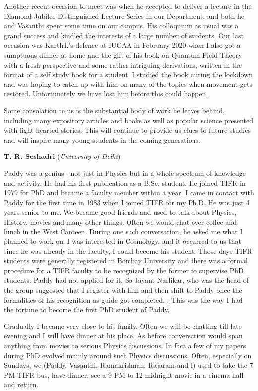 \documentclass[prd, preprint, longbibliography, 11pt]{revtex4-1}
\begin{document}
Another recent occasion to meet was when he accepted to deliver a lecture in the Diamond Jubilee Distinguished Lecture Series in our Department, and both he and Vasanthi spent some time on our campus.  His colloquium as usual was a grand success and kindled the interests of a large number of students. Our last occasion was Karthik’s defence at IUCAA in February 2020 when I also got a sumptuous dinner at home and the gift of his book on Quantum Field Theory with a fresh perspective and some rather intriguing derivations, written in the format of a self study book for a student. I studied the book during the lockdown and was hoping to catch up with him on many of the topics when movement gets restored. Unfortunately we have lost him before this could happen. 


Some consolation to us is the substantial body of work he leaves behind, including many expository articles and books as well as popular science  presented with light hearted stories. This will continue to provide us clues to future studies and will inspire many young students in the coming generations. 

\bigskip
\bigskip

\centerline{{\bf T. R. Seshadri} ({\it University of Delhi})}
\medskip
{}

\noindent Paddy was a genius - not just in Physics but in a whole spectrum of knowledge and activity. He had his first publication as a B.Sc. student. He joined TIFR in 1979 for PhD and became a faculty member within a year. I came in contact with Paddy for the first time in 1983 when I joined TIFR for my Ph.D. He was just 4 years senior to me. We became good friends and used to talk about Physics, History, movies and many other things. Often we would chat over coffee and lunch in the West Canteen. During one such conversation, he asked me what I planned to work on. I was interested in Cosmology, and it occurred to us that since he was already in the faculty, I could become his student. Those days TIFR students were generally registered in Bombay University and there was a formal procedure for a TIFR faculty to be recognized by the former to supervise PhD students. Paddy had not applied for it. So Jayant Narlikar, who was the head of the group suggested that I register with him and then shift to Paddy once the formalities of his recognition as guide got completed. . This was the way I had the fortune to become the first PhD student of Paddy.

Gradually I became very close to his family. Often we will be chatting till late evening and I will have dinner at his place. As before conversation would span anything from movies to serious Physics discussions. In fact a few of my papers during PhD evolved mainly around such Physics discussions. Often, especially on Sundays, we (Paddy, Vasanthi, Ramakrishnan, Rajaram and I) used to take the 7 PM TIFR bus, have dinner, see a 9 PM to 12 midnight movie in a cinema hall and return.
\end{document}
